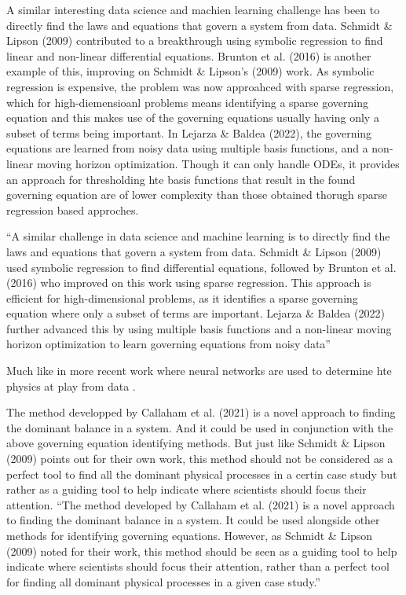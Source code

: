 \documentclass[12pt]{report} %
\begin{document}
A similar interesting data science and machien learning challenge has been to directly find the laws and equations that govern a system from data. Schmidt \& Lipson (2009)\cite{schmidt2009distilling} contributed to a breakthrough using symbolic regression to find linear and non-linear differential equations. Brunton et al. (2016)\cite{brunton2016discovering} is another example of this, improving on Schmidt \& Lipson's (2009)\cite{schmidt2009distilling} work. As symbolic regression is expensive, the problem was now approahced with sparse regression, which for high-diemensioanl problems means identifying a sparse governing equation and this makes use of the governing equations usually having only a subset of terms being important. In Lejarza \& Baldea (2022)\cite{lejarza2022data}, the governing equations are learned from noisy data using multiple basis functions, and a non-linear moving horizon optimization. Though it can only handle ODEs, it provides an approach for thresholding hte basis functions that result in the found governing equation are of lower complexity than those obtained thorugh sparse regression based approches.

``A similar challenge in data science and machine learning is to directly find the laws and equations that govern a system from data. Schmidt \& Lipson (2009) used symbolic regression to find differential equations, followed by Brunton et al. (2016) who improved on this work using sparse regression. This approach is efficient for high-dimensional problems, as it identifies a sparse governing equation where only a subset of terms are important. Lejarza \& Baldea (2022) further advanced this by using multiple basis functions and a non-linear moving horizon optimization to learn governing equations from noisy data''



Much like in more recent work where neural networks are used to determine hte physics at play from data \cite{cranmer2020discovering}\cite{cranmer2020lagrangian}.

The method developped by Callaham et al. (2021)\cite{callaham2021learning} is a novel approach to finding the dominant balance in a system. And it could be used in conjunction with the above governing equation identifying methods. But just like Schmidt \& Lipson (2009)\cite{schmidt2009distilling} points out for their own work, this method should not be considered as a perfect tool to find all the dominant physical processes in a certin case study but rather as a guiding tool to help indicate where scientists should focus their attention.
``The method developed by Callaham et al. (2021) is a novel approach to finding the dominant balance in a system. It could be used alongside other methods for identifying governing equations. However, as Schmidt \& Lipson (2009) noted for their work, this method should be seen as a guiding tool to help indicate where scientists should focus their attention, rather than a perfect tool for finding all dominant physical processes in a given case study.''
\end{document}
